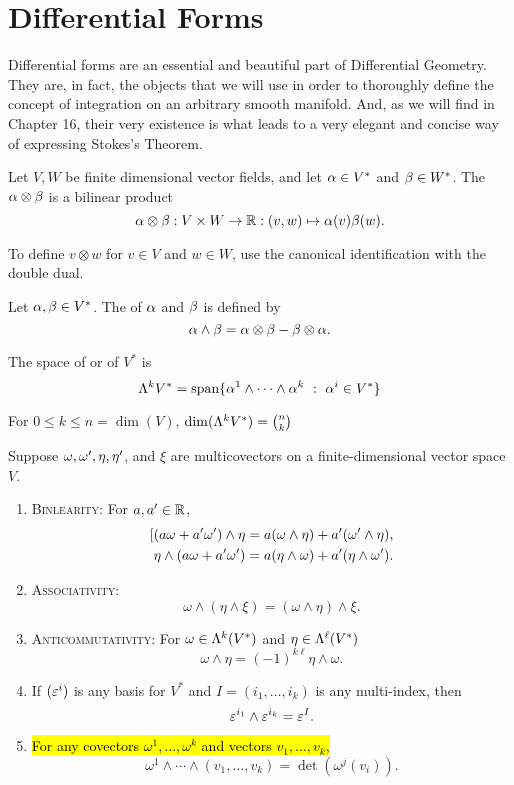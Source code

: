 \newpage\setcounter{section}{13}
\section{Differential Forms}

Differential forms are an essential and beautiful part of Differential Geometry. They are, in fact, the objects that we will use in order to thoroughly define the concept of integration on an arbitrary smooth manifold. And, as we will find in Chapter 16, their very existence is what leads to a very elegant and concise way of expressing Stokes's Theorem.

\dfn Let $V, W$ be finite dimensional vector fields, and let $\alpha\in V^*$ and $\beta \in W^*$. The  $\alpha\otimes\beta$ is a bilinear product
\[\alpha\otimes\beta:V\times W\rightarrow \mathbb{R}:(v,w)\mapsto \alpha(v)\beta(w).\]

\nb To define $v\otimes w$ for $v\in V$ and $w\in W$, use the canonical identification with the double dual.

\dfn Let $\alpha,\beta\in V^*$. The  of $\alpha$ and $\beta$ is defined by
\[\alpha\wedge\beta = \alpha\otimes \beta - \beta\otimes \alpha.\]

\dfn The space of  or  of $V^*$ is 
\[\Lambda^kV^* = \text{span}\{\alpha^1\wedge\cdots\wedge\alpha^k\ :\ \alpha^i\in V^*\}\]

\nb For $0\leq k \leq n = \dim(V)$, $\dim(\Lambda^kV^*) = {n \choose k}$

\setcounter{thm}{10}

\begin{prop} Suppose $\omega,\omega^\prime,\eta,\eta^\prime$, and $\xi$ are multicovectors on a finite-dimensional vector space $V$.
\begin{enumerate}
    \item {\scshape Binlearity:} For $a,a^\prime\in \mathbb{R}$,
    \begin{align*}
        [(a\omega + a^\prime\omega^\prime)\wedge\eta = a(\omega\wedge\eta) + a^\prime(\omega^\prime\wedge\eta),\\
        \eta\wedge(a\omega + a^\prime\omega^\prime) = a(\eta\wedge\omega) + a^\prime(\eta\wedge\omega^\prime).
    \end{align*}
    \item {\scshape Associativity:}
        \[\omega\wedge(\eta\wedge\xi) = (\omega\wedge\eta)\wedge\xi.\]
    \item {\scshape Anticommutativity:} For $\omega\in\Lambda^k(V^*)$ and $\eta\in\Lambda^\ell(V^*)$
    \[\omega\wedge\eta = (-1)^{k\ell}\eta\wedge\omega.\]
    \item If $(\varepsilon^i)$ is any basis for $V^*$ and $I = (i_1,\ldots,i_k)$ is any multi-index, then
    \[\varepsilon^{i_1}\wedge\varepsilon^{i_k} = \varepsilon^I.\]
    \item \hl{For any covectors $\omega^1,\ldots,\omega^k$ and vectors $v_1,\ldots,v_k$,}
    \[\omega^1\wedge\cdots\wedge(v_1,\ldots,v_k) = \det(\omega^j(v_i)).\]
\end{enumerate}
\end{prop}


